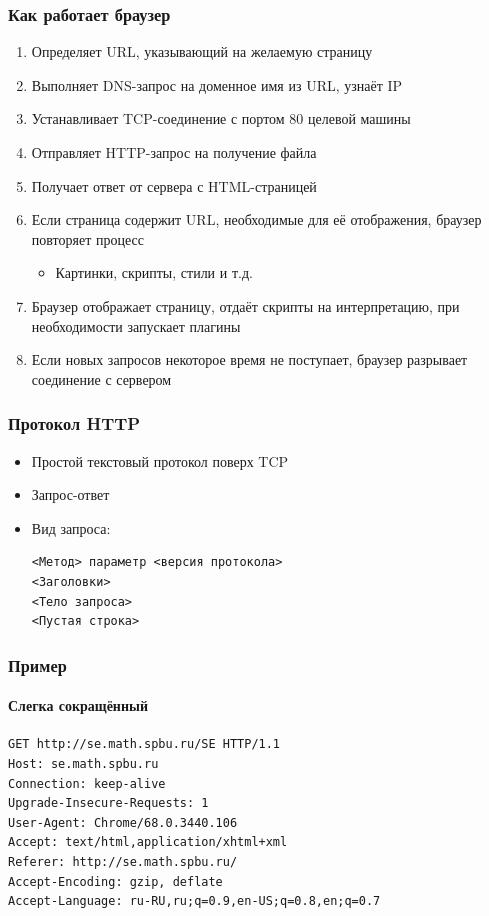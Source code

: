 \documentclass{../../slides-style}
\begin{document}
    \begin{frame}
        \frametitle{Как работает браузер}
        \begin{enumerate}
            \item Определяет URL, указывающий на желаемую страницу
            \item Выполняет DNS-запрос на доменное имя из URL, узнаёт IP
            \item Устанавливает TCP-соединение с портом 80 целевой машины
            \item Отправляет HTTP-запрос на получение файла
            \item Получает ответ от сервера с HTML-страницей
            \item Если страница содержит URL, необходимые для её отображения, браузер повторяет процесс
            \begin{itemize}
                \item Картинки, скрипты, стили и т.д.
            \end{itemize}
            \item Браузер отображает страницу, отдаёт скрипты на интерпретацию, при необходимости запускает плагины
            \item Если новых запросов некоторое время не поступает, браузер разрывает соединение с сервером
        \end{enumerate}
    \end{frame}

    \begin{frame}[fragile]
        \frametitle{Протокол HTTP}
        \begin{itemize}
            \item Простой текстовый протокол поверх TCP
            \item Запрос-ответ
            \item Вид запроса:
            \begin{verbatim}
<Метод> параметр <версия протокола>
<Заголовки>
<Тело запроса>
<Пустая строка>
            \end{verbatim}
        \end{itemize}
    \end{frame}

    \begin{frame}[fragile]
        \frametitle{Пример}
        \framesubtitle{Слегка сокращённый}
        \begin{verbatim}
GET http://se.math.spbu.ru/SE HTTP/1.1
Host: se.math.spbu.ru
Connection: keep-alive
Upgrade-Insecure-Requests: 1
User-Agent: Chrome/68.0.3440.106 
Accept: text/html,application/xhtml+xml
Referer: http://se.math.spbu.ru/
Accept-Encoding: gzip, deflate
Accept-Language: ru-RU,ru;q=0.9,en-US;q=0.8,en;q=0.7

        \end{verbatim}
    \end{frame}
\end{document}
